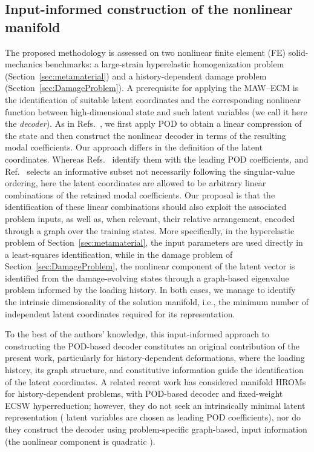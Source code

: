 \documentclass[preprint,10pt]{elsarticle}  %
\begin{document}
  \subsection{Input-informed construction of the nonlinear manifold}
 \label{sec:inputinformed}
The proposed methodology is assessed on two nonlinear finite element (FE) solid-mechanics
benchmarks: a large-strain hyperelastic homogenization problem (Section~\ref{sec:metamaterial}) and a
history-dependent damage problem (Section~\ref{sec:DamageProblem}).
A prerequisite for applying the
MAW--ECM is the identification of suitable latent coordinates and the
corresponding nonlinear function between high-dimensional state and such latent variables (we call it here the  \emph{decoder}).   As in Refs.~\cite{barnett2023neural,ares2026nonlinear,koike2026sparse},
we first apply POD to obtain a linear compression of the state and then
construct the nonlinear decoder in terms of the resulting modal
coefficients. Our approach differs in the definition of the latent
coordinates.  Whereas
Refs.~\cite{barnett2023neural,ares2026nonlinear} identify them with the
leading POD coefficients, and Ref.~\cite{koike2026sparse} selects an
informative subset not necessarily following the singular-value
ordering, here the latent coordinates are allowed to be arbitrary
linear combinations of the retained modal coefficients.
Our proposal is that the identification of these linear combinations should also exploit
the associated problem inputs, as well as, when relevant,  their relative arrangement,
encoded through a graph over the training states. More specifically, in the
hyperelastic problem of Section~\ref{sec:metamaterial}, the input parameters
are used directly in a least-squares identification, while in the damage
problem of Section~\ref{sec:DamageProblem}, the nonlinear component of the
latent vector is identified from the damage-evolving states through a
graph-based eigenvalue problem informed by the loading history. In both cases, we manage to identify the intrinsic
dimensionality of the solution manifold, i.e., the minimum number of
independent latent coordinates required for its representation.

 To the best of the authors' knowledge, this input-informed approach to
constructing the POD-based decoder constitutes an original contribution
of the present work, particularly for history-dependent deformations,
where the loading history, its graph structure, and constitutive
information guide the identification of the latent coordinates. A related recent work  \cite{zhang2026unified}   has considered    manifold HROMs for
history-dependent problems, with POD-based  decoder  and fixed-weight ECSW hyperreduction;  however, they do not seek an
intrinsically minimal latent representation (  latent variables are chosen as leading POD coefficients), nor do they construct the
decoder using problem-specific graph-based, input information   (the nonlinear component is   quadratic ).
\end{document}
